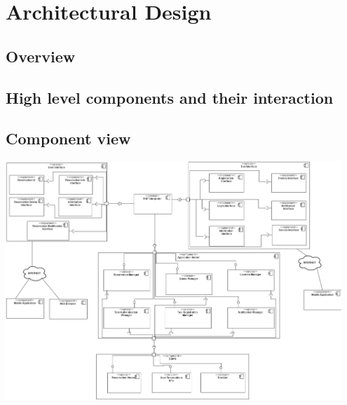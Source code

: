 \section{Architectural Design}
\subsection{Overview}
	
\subsection{High level components and their interaction}
\subsection{Component view}
	\begin{center}
		\includegraphics[width=0.95\textwidth]{./images/component_view.png}
	\end{center}
	
